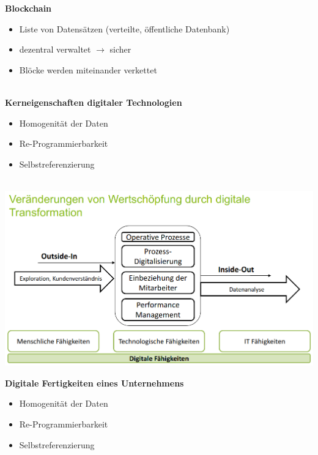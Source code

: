 \documentclass[a4]{scrartcl}
\begin{document}
\textbf{Blockchain}
\begin{itemize}
\item Liste von Datensätzen (verteilte, öffentliche Datenbank)
\item dezentral verwaltet $\rightarrow$ sicher
\item Blöcke werden miteinander verkettet
\end{itemize}

\ \\

\textbf{Kerneigenschaften digitaler Technologien}
\begin{itemize}
\item Homogenität der Daten
\item Re-Programmierbarkeit
\item Selbstreferenzierung
\end{itemize}
 \ \\

\includegraphics[scale=0.3]{veraenderung.png}


\newpage

\textbf{Digitale Fertigkeiten eines Unternehmens}
\begin{itemize}
\item Homogenität der Daten
\item Re-Programmierbarkeit
\item Selbstreferenzierung
\end{itemize}
 \ \\
\end{document}
